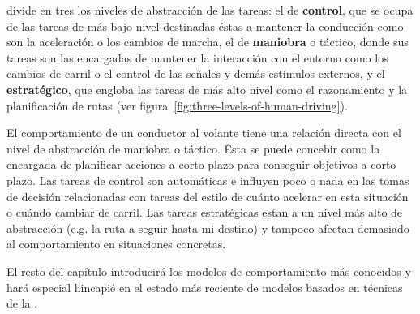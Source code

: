 \cite{michon1985critical} divide en tres los niveles de abstracción de las tareas: el de \textbf{control}, que se ocupa de las tareas de más bajo nivel destinadas éstas a mantener la conducción como son la aceleración o los cambios de marcha, el de \textbf{maniobra} o táctico, donde sus tareas son las encargadas de mantener la interacción con el entorno como los cambios de carril o el control de las señales y demás estímulos externos, y el \textbf{estratégico}, que engloba las tareas de más alto nivel como el razonamiento y la planificación de rutas (ver figura~\ref{fig:three-levels-of-human-driving}).

El comportamiento de un conductor al volante tiene una relación directa con el nivel de abstracción de maniobra o táctico. Ésta se puede concebir como la encargada de planificar acciones a corto plazo para conseguir objetivos a corto plazo. Las tareas de control son automáticas e influyen poco o nada en las tomas de decisión relacionadas con tareas del estilo de cuánto acelerar en esta situación o cuándo cambiar de carril. Las tareas estratégicas estan a un nivel más alto de abstracción (e.g. la ruta a seguir hasta mi destino) y tampoco afectan demasiado al comportamiento en situaciones concretas.

El resto del capítulo introducirá los modelos de comportamiento más conocidos y hará especial hincapié en el estado más reciente de modelos basados en técnicas de la .

